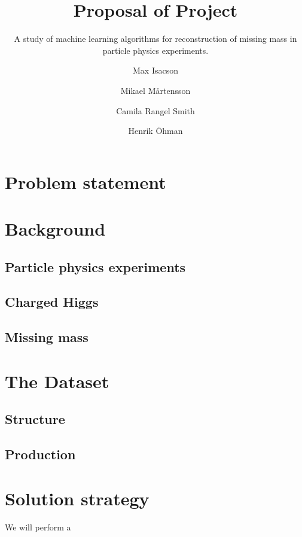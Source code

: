 \documentclass{scrartcl}
\title{Proposal of Project}
\subtitle{A study of machine learning algorithms for reconstruction of missing mass in particle physics experiments.}
\author[1]{Max Isacson}
\author[2]{Mikael M\aa rtensson}
\author[3]{Camila Rangel Smith}
\author[4]{Henrik \"{O}hman}
\affil[1]{\small\url{max.isacson@physics.uu.se}}
\affil[2]{\url{mikael.martensson@physics.uu.se}}
\affil[3]{\url{camila.rangel@physics.uu.se}}
\affil[4]{\url{ohman@cern.ch}}
\begin{document}
\maketitle

\section{Problem statement}


\section{Background}
\subsection{Particle physics experiments}

\subsection{Charged Higgs}
\subsection{Missing mass}


\section{The Dataset}
\subsection{Structure}

\subsection{Production}


\section{Solution strategy}
We will perform a 


% 
\end{document}
